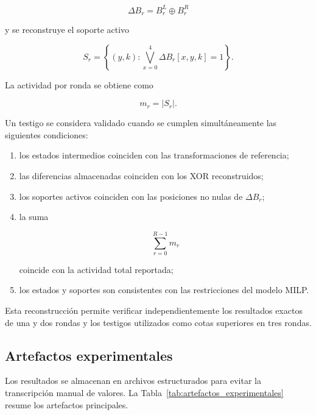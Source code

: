 \[
\Delta B_r
=
B_r^L \oplus B_r^R
\]

y se reconstruye el soporte activo

\[
S_r
=
\left\{
(y,k):
\bigvee_{x=0}^{4}
\Delta B_r[x,y,k]=1
\right\}.
\]

La actividad por ronda se obtiene como

\[
m_r=|S_r|.
\]

Un testigo se considera validado cuando se cumplen simultáneamente las
siguientes condiciones:

\begin{enumerate}
    \item los estados intermedios coinciden con las transformaciones de
    referencia;

    \item las diferencias almacenadas coinciden con los XOR reconstruidos;

    \item los soportes activos coinciden con las posiciones no nulas de
    $\Delta B_r$;

    \item la suma

    \[
    \sum_{r=0}^{R-1}m_r
    \]

    coincide con la actividad total reportada;

    \item los estados y soportes son consistentes con las restricciones del
    modelo MILP.
\end{enumerate}

Esta reconstrucción permite verificar independientemente los resultados
exactos de una y dos rondas y los testigos utilizados como cotas superiores
en tres rondas.


\subsection{Artefactos experimentales}
\label{subsec:artefactos_experimentales}

Los resultados se almacenan en archivos estructurados para evitar la
transcripción manual de valores. La
Tabla~\ref{tab:artefactos_experimentales} resume los artefactos principales.

